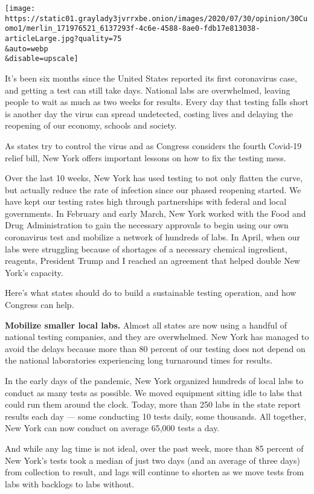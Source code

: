 \texttt{[image: https://static01.graylady3jvrrxbe.onion/images/2020/07/30/opinion/30Cuomo1/merlin\_171976521\_6137293f-4c6e-4588-8ae0-fdb17e813038-articleLarge.jpg?quality=75\\\&auto=webp\\\&disable=upscale]}

It's been six months since the United States reported its first
coronavirus case, and getting a test can still take days. National labs
are overwhelmed, leaving people to wait as much as two weeks for
results. Every day that testing falls short is another day the virus can
spread undetected, costing lives and delaying the reopening of our
economy, schools and society.

As states try to control the virus and as Congress considers the fourth
Covid-19 relief bill, New York offers important lessons on how to fix
the testing mess.

Over the last 10 weeks, New York has used testing to not only flatten
the curve, but actually reduce the rate of infection since our phased
reopening started. We have kept our testing rates high through
partnerships with federal and local governments. In February and early
March, New York worked with the Food and Drug Administration to gain the
necessary approvals to begin using our own coronavirus test and mobilize
a network of hundreds of labs. In April, when our labs were struggling
because of shortages of a necessary chemical ingredient, reagents,
President Trump and I reached an agreement that helped double New York's
capacity.

Here's what states should do to build a sustainable testing operation,
and how Congress can help.

\textbf{Mobilize smaller local labs.} Almost all states are now using a
handful of national testing companies, and they are overwhelmed. New
York has managed to avoid the delays because more than 80 percent of our
testing does not depend on the national laboratories experiencing long
turnaround times for results.

In the early days of the pandemic, New York organized hundreds of local
labs to conduct as many tests as possible. We moved equipment sitting
idle to labs that could run them around the clock. Today, more than 250
labs in the state report results each day --- some conducting 10 tests
daily, some thousands. All together, New York can now conduct on average
65,000 tests a day.

And while any lag time is not ideal, over the past week, more than 85
percent of New York's tests took a median of just two days (and an
average of three days) from collection to result, and lags will continue
to shorten as we move tests from labs with backlogs to labs without.

